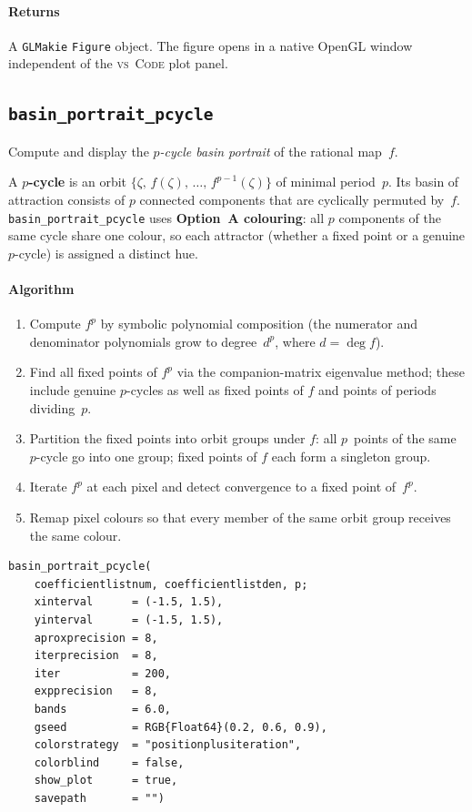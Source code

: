\documentclass[11pt,a4paper]{article}
\theoremstyle{definition}
\newcommand{\pkg}[1]{\texttt{#1}}
\newcommand{\fn}[1]{\texttt{#1}}
\begin{document}
\paragraph{Returns}
A \pkg{GLMakie} \texttt{Figure} object.
The figure opens in a native OpenGL window independent of the
\textsc{vs~Code} plot panel.


\subsection{\fn{basin\_portrait\_pcycle}}
\label{sec:pcycle}

Compute and display the \emph{$p$-cycle basin portrait} of the rational
map~$f$.

A \textbf{$p$-cycle} is an orbit $\{\zeta,\,f(\zeta),\,\ldots,\,f^{p-1}(\zeta)\}$
of minimal period~$p$.  Its basin of attraction consists of $p$ connected
components that are cyclically permuted by~$f$.
\fn{basin\_portrait\_pcycle} uses \textbf{Option~A colouring}: all $p$
components of the same cycle share one colour, so each attractor
(whether a fixed point or a genuine $p$-cycle) is assigned a distinct hue.

\paragraph{Algorithm}
\begin{enumerate}[nosep]
  \item Compute $f^p$ by symbolic polynomial composition
    (the numerator and denominator polynomials grow to degree~$d^p$,
    where $d = \deg f$).
  \item Find all fixed points of $f^p$ via the companion-matrix
    eigenvalue method; these include genuine $p$-cycles as well as fixed
    points of $f$ and points of periods dividing~$p$.
  \item Partition the fixed points into orbit groups under $f$: all
    $p$~points of the same $p$-cycle go into one group; fixed points of
    $f$ each form a singleton group.
  \item Iterate $f^p$ at each pixel and detect convergence to a fixed
    point of~$f^p$.
  \item Remap pixel colours so that every member of the same orbit group
    receives the same colour.
\end{enumerate}

\begin{lstlisting}
basin_portrait_pcycle(
    coefficientlistnum, coefficientlistden, p;
    xinterval      = (-1.5, 1.5),
    yinterval      = (-1.5, 1.5),
    aproxprecision = 8,
    iterprecision  = 8,
    iter           = 200,
    expprecision   = 8,
    bands          = 6.0,
    gseed          = RGB{Float64}(0.2, 0.6, 0.9),
    colorstrategy  = "positionplusiteration",
    colorblind     = false,
    show_plot      = true,
    savepath       = "")
\end{lstlisting}
\end{document}
